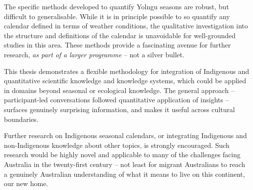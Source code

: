 \clearpage

The specific methods developed to quantify Yolngu seasons are robust, but
difficult to generalisable.  While it is in principle possible to so quantify
any calendar defined in terms of weather conditions, the qualitative
investigation into the structure and definitions of the calendar is unavoidable
for well-grounded studies in this area.  These methods provide a fascinating
avenue for further research, \emph{as part of a larger programme} -- not a
silver bullet.

This thesis demonstrates a flexible methodology for integration
of Indigenous and quantitative scientific knowledge and knowledge systems,
which could be applied in domains beyond seasonal or ecological knowledge.
The general approach -- participant-led conversations followed quantitative
application of insights -- surfaces genuinely surprising information, and
makes it useful across cultural boundaries.

Further research on Indigenous seasonal calendars, or integrating Indigenous
and non-Indigenous knowledge about other topics, is strongly encouraged.  Such
research would be highly novel and applicable to many of the challenges facing
Australia in the twenty-first century -- not least for migrant Australians to
reach a genuinely Australian understanding of what it means to live on this
continent, our new home.

